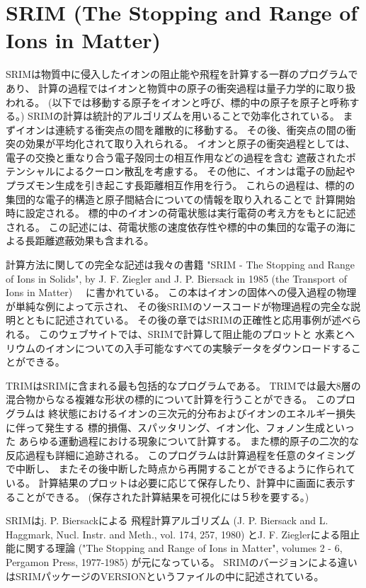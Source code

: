 \documentclass [11pt,a4paper,dvipdfmx] {jarticle}
\begin{document}
\section{SRIM (The Stopping and Range of Ions in Matter)}
SRIMは物質中に侵入したイオンの阻止能や飛程を計算する一群のプログラムであり、
計算の過程ではイオンと物質中の原子の衝突過程は量子力学的に取り扱われる。
 (以下では移動する原子をイオンと呼び、標的中の原子を原子と呼称する。) 
SRIMの計算は統計的アルゴリズムを用いることで効率化されている。
まずイオンは連続する衝突点の間を離散的に移動する。
その後、衝突点の間の衝突の効果が平均化されて取り入れられる。
イオンと原子の衝突過程としては、電子の交換と重なり合う電子殻同士の相互作用などの過程を含む
遮蔽されたポテンシャルによるクーロン散乱を考慮する。
その他に、イオンは電子の励起やプラズモン生成を引き起こす長距離相互作用を行う。
これらの過程は、標的の集団的な電子的構造と原子間結合についての情報を取り入れることで
計算開始時に設定される。
標的中のイオンの荷電状態は実行電荷の考え方をもとに記述される。
この記述には、荷電状態の速度依存性や標的中の集団的な電子の海による長距離遮蔽効果も含まれる。

計算方法に関しての完全な記述は我々の書籍
 "SRIM - The Stopping and Range of Ions in Solids",
  by J. F. Ziegler and J. P. Biersack in 1985 (the Transport of Ions in Matter)　
に書かれている。
この本はイオンの固体への侵入過程の物理が単純な例によって示され、
その後SRIMのソースコードが物理過程の完全な説明とともに記述されている。
その後の章ではSRIMの正確性と応用事例が述べられる。
このウェブサイトでは、SRIMで計算して阻止能のプロットと
水素とヘリウムのイオンについての入手可能なすべての実験データをダウンロードすることができる。

TRIMはSRIMに含まれる最も包括的なプログラムである。
TRIMでは最大8層の混合物からなる複雑な形状の標的について計算を行うことができる。
このプログラムは
終状態におけるイオンの三次元的分布およびイオンのエネルギー損失に伴って発生する
標的損傷、スパッタリング、イオン化、フォノン生成といった
あらゆる運動過程における現象について計算する。
また標的原子の二次的な反応過程も詳細に追跡される。
このプログラムは計算過程を任意のタイミングで中断し、
またその後中断した時点から再開することができるように作られている。
計算結果のプロットは必要に応じて保存したり、計算中に画面に表示することができる。
 (保存された計算結果を可視化には５秒を要する。)

SRIMはj. P. Biersackによる
飛程計算アルゴリズム (J. P. Biersack and L. Haggmark, Nucl. Instr. and Meth., vol. 174, 257, 1980) 
とJ. F. Zieglerによる阻止能に関する理論 ("The Stopping and Range of Ions in Matter", volumes 2 - 6, Pergamon Press, 1977-1985)
が元になっている。
SRIMのバージョンによる違いはSRIMパッケージのVERSIONというファイルの中に記述されている。
\end{document}
